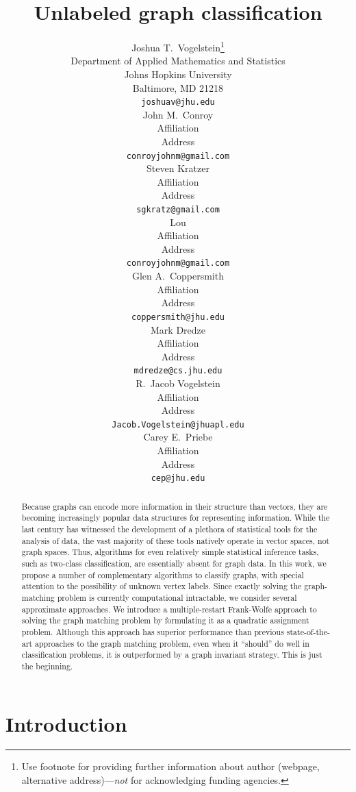 \documentclass{article} %
\title{Unlabeled graph classification}
\author{
Joshua T.~Vogelstein\thanks{ Use footnote for providing further information
about author (webpage, alternative address)---\emph{not} for acknowledging
funding agencies.} \\
Department of Applied Mathematics and Statistics\\
Johns Hopkins University\\
Baltimore, MD 21218 \\
\texttt{joshuav@jhu.edu} \\
\And
John M.~Conroy \\
Affiliation \\
Address \\
\texttt{conroyjohnm@gmail.com} \\
\AND
Steven Kratzer \\
Affiliation \\
Address \\
\texttt{sgkratz@gmail.com} \\
\AND
Lou \\
Affiliation \\
Address \\
\texttt{conroyjohnm@gmail.com} \\
\AND
Glen A.~Coppersmith \\
Affiliation \\
Address \\
\texttt{coppersmith@jhu.edu} \\
\And
Mark Dredze \\
Affiliation \\
Address \\
\texttt{mdredze@cs.jhu.edu} \\
\And
R.~Jacob Vogelstein \\
Affiliation \\
Address \\
\texttt{Jacob.Vogelstein@jhuapl.edu} \\
\And
Carey E.~Priebe \\
Affiliation \\
Address \\
\texttt{cep@jhu.edu} \\
}
\begin{document}
 
\maketitle

\begin{abstract}
Because graphs can encode more information in their structure than vectors, they are becoming increasingly popular data structures for representing information.  While the last century has witnessed the development of a plethora of statistical tools for the analysis of data, the vast majority of these tools natively operate in vector spaces, not graph spaces.  Thus, algorithms for even relatively simple statistical inference tasks, such as two-class classification,  are essentially absent for graph data.  In this work, we propose a number of complementary algorithms to classify graphs, with special attention to the possibility of unknown vertex labels.  Since exactly solving the graph-matching problem is currently computational intractable, we consider several approximate approaches.  We introduce a multiple-restart Frank-Wolfe approach to solving the graph matching problem by formulating it as a quadratic assignment problem.  Although this approach has superior performance than previous state-of-the-art approaches to the graph matching problem, even when it ``should'' do well in classification problems, it is outperformed by a graph invariant strategy.  This is just the beginning. 
\end{abstract}

\section{Introduction}
\end{document}
